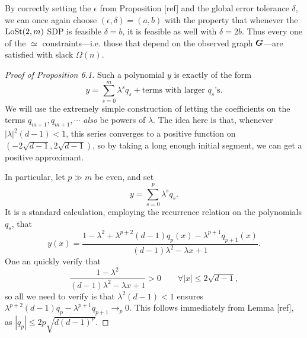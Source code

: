 \begin{remark}
    By correctly setting the $\epsilon$ from Proposition [ref] and the global error tolerance $\delta$, we can once again choose $(\epsilon,\delta) = (a,b)$ with the property that whenever the $\operatorname{LoSt}(2,m)$ SDP is feasible $\delta = b$, it is feasible as well with $\delta = 2b$. Thus every one of the $\simeq$ constraints---i.e. those that depend on the observed graph $\boldsymbol{G}$---are satisfied with slack $\Omega(n)$.
\end{remark}

\begin{proof}[Proof of Proposition 6.1]
    Such a polynomial $y$ is exactly of the form
    $$
        y = \sum_{s = 0}^m \lambda^s q_s + \text{terms with larger $q_s$'s}.
    $$
    We will use the extremely simple construction of letting the coefficients on the terms $q_{m+1},q_{m+1}, \cdots$ \emph{also} be powers of $\lambda$. The idea here is that, whenever $|\lambda|^2(d-1) < 1$, this series converges to a positive function on $(-2\sqrt{d-1},2\sqrt{d-1})$, so by taking a long enough initial segment, we can get a positive approximant. 

    In particular, let $p \gg m$ be even, and set
    $$
        y = \sum_{s = 0}^p \lambda^s q_s.
    $$
    It is a standard calculation, employing the recurrence relation on the polynomials $q_s$, that
    $$
        y(x) = \frac{1 - \lambda^2 + \lambda^{p+2}(d-1)q_p(x) - \lambda^{p+1}q_{p+1}(x)}{(d-1)\lambda^2 - \lambda x + 1}.
    $$
    One an quickly verify that
    $$
        \frac{1 - \lambda^2}{(d-1)\lambda^2 - \lambda x + 1} > 0 \qquad \forall |x| \le 2\sqrt{d-1},
    $$
    so all we need to verify is that $\lambda^2(d-1) < 1$ ensures $\lambda^{p+2}(d-1)q_p - \lambda^{p+1}q_{p+1} \to_p 0$. This follows immediately from Lemma [ref], as $|q_p| \le 2p\sqrt{d(d-1)^p}$.
\end{proof}

